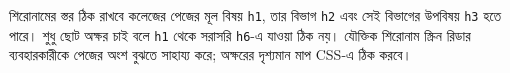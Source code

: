 \begin{keypointbox}{শিরোনামের স্তর ঠিক রাখবে}
কলেজের পেজের মূল বিষয় \texttt{h1}, তার বিভাগ \texttt{h2} এবং সেই বিভাগের উপবিষয় \texttt{h3} হতে পারে। শুধু ছোট অক্ষর চাই বলে \texttt{h1} থেকে সরাসরি \texttt{h6}-এ যাওয়া ঠিক নয়। যৌক্তিক শিরোনাম স্ক্রিন রিডার ব্যবহারকারীকে পেজের অংশ বুঝতে সাহায্য করে; অক্ষরের দৃশ্যমান মাপ CSS-এ ঠিক করবে।
\end{keypointbox}
